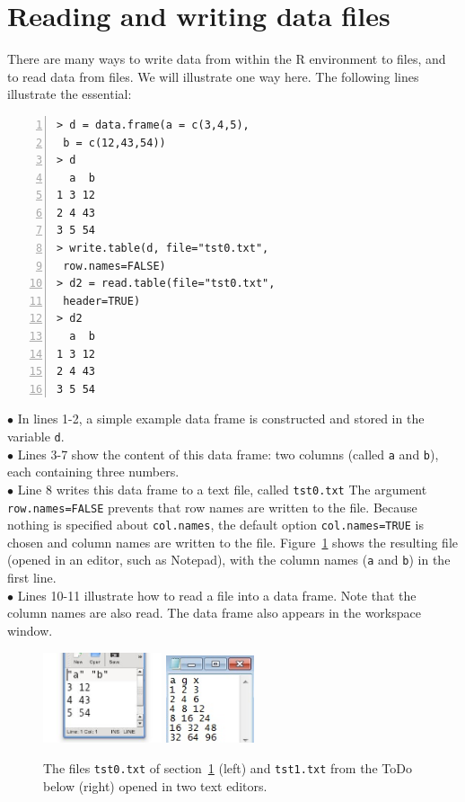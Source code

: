 \documentclass[a4paper,11pt,twocolumn,tablecaptionabove]{scrartcl} %
\begin{document}
\section{Reading and writing data files}
\label{sec:reading-writing-data}

There are many ways to write data from within the R environment to files, and to read data from files. We will illustrate one way here. The following lines illustrate the essential:

\begin{Verbatim}[frame=single,numbers=left,gobble=0, xleftmargin=0.35cm, numbersep=0.1cm]
> d = data.frame(a = c(3,4,5), 
 b = c(12,43,54))
> d
  a  b
1 3 12
2 4 43
3 5 54
> write.table(d, file="tst0.txt",
 row.names=FALSE)
> d2 = read.table(file="tst0.txt", 
 header=TRUE)
> d2
  a  b
1 3 12
2 4 43
3 5 54
\end{Verbatim}
\noindent $\bullet$ In lines 1-2, a simple example data frame is constructed and stored in the
variable \texttt{d}. \\
\noindent $\bullet$ Lines 3-7 show the content of this data frame: two columns (called \texttt{a} and \texttt{b}), each containing three numbers.\\
\noindent $\bullet$ Line 8 writes this data frame to a text file, called \texttt{tst0.txt} The argument
\verb!row.names=FALSE! prevents that row names are written to the file. Because nothing is specified about \texttt{col.names}, the default option \verb!col.names=TRUE! is chosen
and column names are written to the file. Figure~\ref{fig:tst0}
shows the resulting file (opened in an editor, such as Notepad), with the
column names (\texttt{a} and \texttt{b}) in the first line. \\
\noindent $\bullet$ Lines 10-11 illustrate how to read a file into a data frame. Note that the column names are also read. The data frame also appears in the workspace window.\\

\begin{figure}[h]
  \centering
  \includegraphics[width=3.5cm]{img/tst0.jpeg}
  \includegraphics[width=2.6cm]{img/tst1.jpg}
  \caption{The files \texttt{tst0.txt} of section~\ref{sec:reading-writing-data}
    (left) and \texttt{tst1.txt} from the ToDo below (right) opened in two text editors.}
  \label{fig:tst0}
\end{figure}
\end{document}
